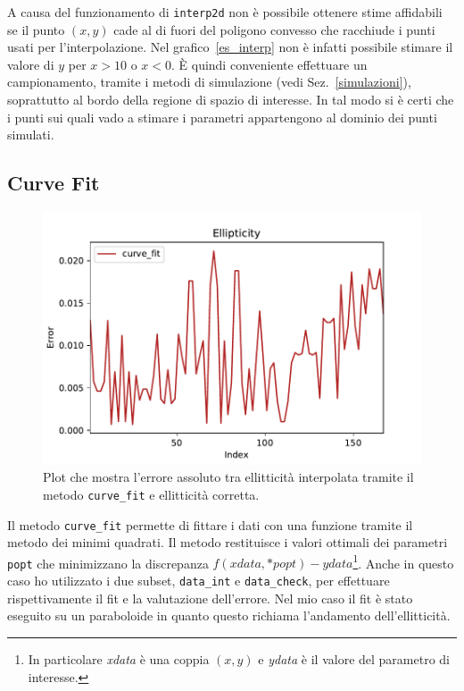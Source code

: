 \documentclass[12pt,a4paper,final]{book}
\begin{document}
A causa del funzionamento di \texttt{interp2d} non è possibile ottenere stime affidabili se il punto $(x, y)$ cade al di fuori del poligono convesso che racchiude i punti usati per l'interpolazione. Nel grafico~\ref{es_interp} non è infatti possibile stimare il valore di $y$ per $x>10$ o $x<0$.
\`E quindi conveniente effettuare un campionamento, tramite i metodi di simulazione (vedi Sez.~\ref{simulazioni}), soprattutto al bordo della regione di spazio di interesse. In tal modo si è certi che i punti sui quali vado a stimare i parametri appartengono al dominio dei punti simulati.


\subsection{Curve Fit}\label{curve_fit}
\begin{figure}[!ht]
	\centering
	\includegraphics[scale=0.7]{../figures/error_curve_fit.pdf}
	\caption{Plot che mostra l'errore assoluto tra ellitticità interpolata tramite il metodo \texttt{curve\_fit} e ellitticità corretta.}
	\label{err_curve_fit}
\end{figure}
Il metodo \texttt{curve\_fit} permette di fittare i dati con una funzione tramite il metodo dei minimi quadrati. Il metodo restituisce i valori ottimali dei parametri \texttt{popt} che minimizzano la discrepanza $f(xdata, *popt) - ydata$\footnote{In particolare \textit{xdata} è una coppia $(x,y)$ e \textit{ydata} è il valore del parametro di interesse.}. Anche in questo caso ho utilizzato i due subset, \texttt{data\_int} e \texttt{data\_check}, per effettuare rispettivamente il fit e la valutazione dell'errore. Nel mio caso il fit è stato eseguito su un paraboloide in quanto questo richiama l'andamento dell'ellitticità.
\end{document}
